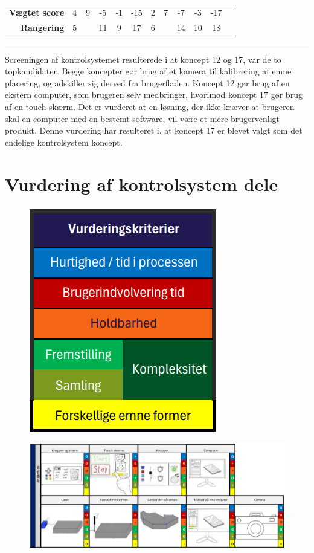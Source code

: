 \begin{table}[H]
\begin{tabular}{|p{2cm}|c c c c c c c c c c c|}
        \multicolumn{1}{|r|}{\cellcolor{lightgray!10} \textbf{Vægtet score}}& 4 & 9 & -5 & -1 & -15 & 2 & 7 & -7 & -3 & \multicolumn{1}{c}{-17} &\multicolumn{1}{|c}{} \\\cline{1-11} 
        
        \multicolumn{1}{|r|}{\cellcolor{lightgray!10}\textbf{Rangering}} & 5 & \multicolumn{1}{c}{\cellcolor{OliveGreen} \textcolor{white}{\textbf{1}}} & 11 & 9 & 17 & 6 &  \multicolumn{1}{c}{\cellcolor{OliveGreen} \textcolor{white}{\textbf{2}}} & 14 & 10 & \multicolumn{1}{c}{18} & \multicolumn{1}{|c}{} \\\cline{1-11}
    \end{tabular}
    \label{tab:selektionsskema kontrolsystem}
\end{table}
\plainbreak{1}
Screeningen af kontrolsystemet resulterede i at koncept 12 og 17, var de to topkandidater. Begge koncepter gør brug af et kamera til kalibrering af emne placering, og adskiller sig derved fra brugerfladen. Koncept 12 gør brug af en ekstern computer, som brugeren selv medbringer, hvorimod koncept 17 gør brug af en touch skærm. Det er vurderet at en løsning, der ikke kræver at brugeren skal en computer med en bestemt software, vil være et mere brugervenligt produkt. Denne vurdering har resulteret i, at koncept 17 er blevet valgt som det endelige kontrolsystem koncept.






\section{Vurdering af kontrolsystem dele}



\begin{figure}[H]
    \centering
    \includegraphics[width=0.25\linewidth]{bilag/Media/Media/delkoncept kontrol beskrivelse.png}
\end{figure}

\begin{figure}[H]
    \centering
    \includegraphics[width=1\linewidth]{bilag/Media/Media/delkoncept kontrol.png}
\end{figure}


